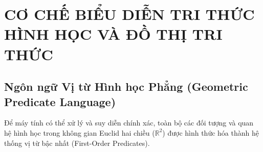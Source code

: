 
\chapter{CƠ CHẾ BIỂU DIỄN TRI THỨC HÌNH HỌC VÀ ĐỒ THỊ TRI THỨC}
\label{chap:representation}

\section{Ngôn ngữ Vị từ Hình học Phẳng (Geometric Predicate Language)}
Để máy tính có thể xử lý và suy diễn chính xác, toàn bộ các đối tượng và quan hệ hình học trong không gian Euclid hai chiều ($\mathbb{R}^2$) được hình thức hóa thành hệ thống vị từ bậc nhất (First-Order Predicates). 


